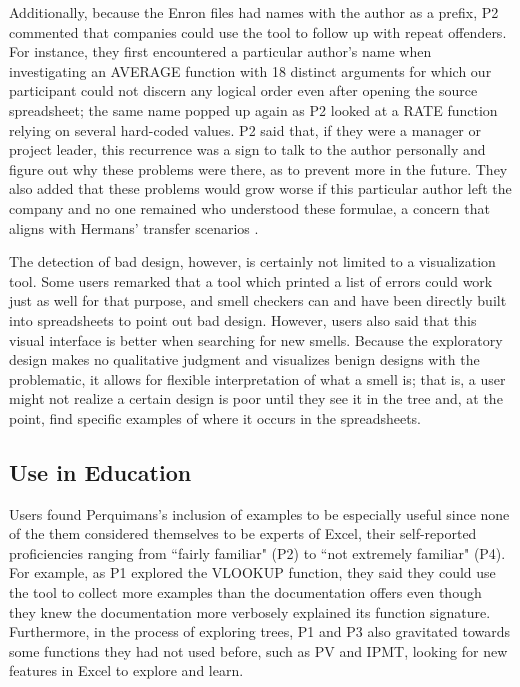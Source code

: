 \documentclass[conference]{IEEEtran}
\newcommand{\toolname}{Perquimans\xspace} \newcommand{\toolnameend}{Perquimans}
\begin{document}
	Additionally, because the Enron files had names with the author as a prefix, P2
	commented that companies could use the tool to follow up with repeat offenders.
	For instance, they first encountered a particular author's name when
	investigating an AVERAGE function with 18 distinct arguments for which our
	participant could not discern any logical order even after opening the source
	spreadsheet; the same name popped up again as P2 looked at a RATE function
	relying on several hard-coded values. P2 said that, if they were a manager or
	project leader, this recurrence was a sign to talk to the author personally and
	figure out why these problems were there, as to prevent more in the future.
	They also added that these problems would grow worse if this particular author
	left the company and no one remained who understood these formulae, a concern
	that aligns with Hermans' transfer scenarios \cite{hermans2011supporting}.
	
	The detection of bad design, however, is certainly not limited to a
	visualization tool. Some users remarked that a tool which printed a list of
	errors could work just as well for that purpose, and smell checkers can and
	have been directly built into spreadsheets to point out bad design. However,
	users also said that this visual interface is better when searching for new
	smells. Because the exploratory design makes no qualitative judgment and
	visualizes benign designs with the problematic, it allows for flexible
	interpretation of what a smell is; that is, a user might not realize a certain
	design is poor until they see it in the tree and, at the point, find specific
	examples of where it occurs in the spreadsheets.
	
	\subsection{Use in Education} Users found \toolname's inclusion of examples to
	be especially useful since none of the them considered themselves to be experts
	of Excel, their self-reported proficiencies ranging from ``fairly familiar"
	(P2) to ``not extremely familiar" (P4). For example, as P1 explored the VLOOKUP
	function, they said they could use the tool to collect more examples than the
	documentation offers even though they knew the documentation more verbosely
	explained its function signature. Furthermore, in the process of exploring
	trees, P1 and P3 also gravitated towards some functions they had not used
	before, such as PV and IPMT, looking for new features in Excel to explore and
	learn. 
	
\end{document}
